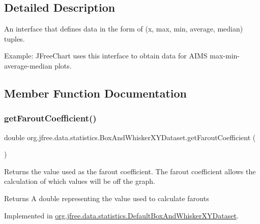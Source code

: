 \subsection{Detailed Description}
An interface that defines data in the form of (x, max, min, average, median) tuples. 

Example\+: J\+Free\+Chart uses this interface to obtain data for A\+I\+MS max-\/min-\/average-\/median plots. 

\subsection{Member Function Documentation}
\mbox{\label{interfaceorg_1_1jfree_1_1data_1_1statistics_1_1_box_and_whisker_x_y_dataset_a83de87c9326c44163e2670b3b00d0280}} 
\subsubsection{\texorpdfstring{get\+Farout\+Coefficient()}{getFaroutCoefficient()}}
{\footnotesize\ttfamily double org.\+jfree.\+data.\+statistics.\+Box\+And\+Whisker\+X\+Y\+Dataset.\+get\+Farout\+Coefficient (\begin{DoxyParamCaption}{ }\end{DoxyParamCaption})}

Returns the value used as the farout coefficient. The farout coefficient allows the calculation of which values will be off the graph.

\begin{DoxyReturn}{Returns}
A {\ttfamily double} representing the value used to calculate farouts 
\end{DoxyReturn}


Implemented in \mbox{\hyperlink{classorg_1_1jfree_1_1data_1_1statistics_1_1_default_box_and_whisker_x_y_dataset_a0e7767b34470a4bb8b74de4c3646e1a9}{org.\+jfree.\+data.\+statistics.\+Default\+Box\+And\+Whisker\+X\+Y\+Dataset}}.

\mbox{\label{interfaceorg_1_1jfree_1_1data_1_1statistics_1_1_box_and_whisker_x_y_dataset_a6591ebc4568691272437f1743610780d}} 
